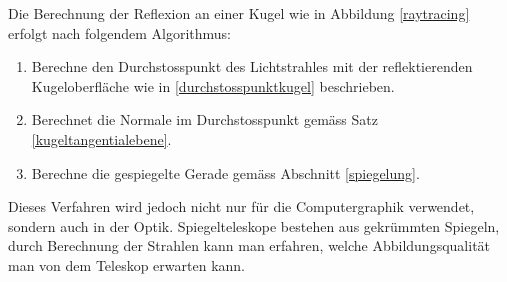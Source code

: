 Die Berechnung der Reflexion an einer Kugel wie in Abbildung \ref{raytracing}
erfolgt nach folgendem Algorithmus:
\begin{enumerate}
\item Berechne den Durchstosspunkt des Lichtstrahles mit der reflektierenden
Kugeloberfläche wie in \ref{durchstosspunktkugel} beschrieben.
\item Berechnet die Normale im Durchstosspunkt gemäss Satz \ref{kugeltangentialebene}.
\item Berechne die gespiegelte Gerade gemäss Abschnitt \ref{spiegelung}.
\end{enumerate}
Dieses Verfahren wird jedoch nicht nur für die Computergraphik verwendet,
sondern auch in der Optik.
Spiegelteleskope bestehen aus gekrümmten Spiegeln,
durch Berechnung der Strahlen kann man erfahren, welche Abbildungsqualität
man von dem Teleskop erwarten kann.

